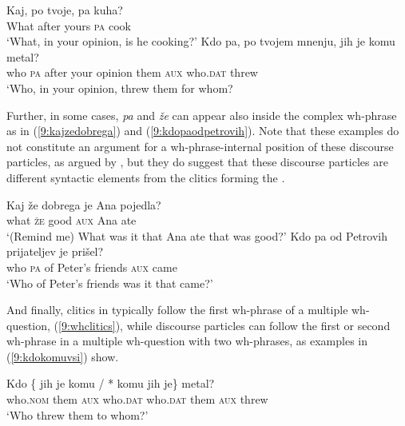 \documentclass[output=paper,modfonts,newtxmath,hidelinks]{langscibook}
\begin{document}
\begin{exe}
\ex \label{9:kdopotvojepak} \gll 
 Kaj, po tvoje, pa kuha?\\
	What after yours	 \textsc{pa} cook\\
	\trans `What, in your opinion, is he cooking?'
\ex \label{9:kdopapotvoje}
 \gll Kdo pa, po tvojem mnenju, jih je komu metal?\\
	who \textsc{pa} after your opinion them \textsc{aux} who.\textsc{dat} threw\\
	\trans  `Who, in your opinion, threw them for whom?
\end{exe}

\noindent Further, in some cases, \textit{pa} and \textit{že} can appear also inside the complex wh-phrase as in (\ref{9:kajzedobrega}) and (\ref{9:kdopaodpetrovih}). Note that these examples do not constitute an argument for a wh-phrase-internal position of these discourse particles, as argued by \cite{marusicetal2015}, but they do suggest that these discourse particles are different syntactic elements from the clitics forming the .

\begin{exe}
\ex \label{9:kajzedobrega}
\gll Kaj že dobrega je Ana 	pojedla? \\
 	what \textsc{že} good \textsc{aux} Ana	ate\\
\trans  `(Remind me) What was it that Ana ate that was good?'
\ex \label{9:kdopaodpetrovih}
\gll Kdo pa od Petrovih prijateljev je prišel?\\
 	who \textsc{pa} of Peter's friends \textsc{aux} came\\
\glt  `Who of Peter's friends was it that came?'\\
\hfill\citep[(38)]{marusicetal2015}
\end{exe}

\noindent And finally, clitics in  typically follow the first wh-phrase of a multiple wh-question, (\ref{9:whclitics}), while discourse particles can follow the first or second wh-phrase in a multiple wh-question with two wh-phrases, as examples in (\ref{9:kdokomuvsi}) show.  

\begin{exe}
\ex  \label{9:whclitics}
 \gll Kdo \{\hspace{-2pt} jih je komu / *\hspace{-2pt} komu jih je\} metal?\\
   who.\textsc{nom} {} them \textsc{aux} who.\textsc{dat} {} {} who.\textsc{dat} them \textsc{aux} threw \\
   \glt `Who threw them to whom?'
\end{exe}
\end{document}
